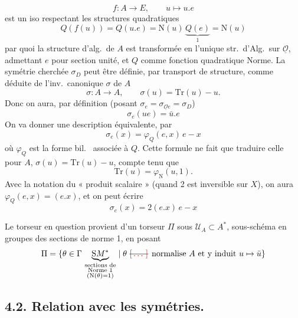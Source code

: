 \documentclass[11pt,a4paper]{article}
\begin{document}
\[
  f \colon A \to E, \qquad u \mapsto u.e
\]
est un iso respectant les structures quadratiques
\[
  Q(f(u)) = Q(u.e) = \mathrm{N}(u)\, \underbrace{Q(e)}_{1} = \mathrm{N}(u)
\]
par quoi la structure d'alg.\ de $A$ est transformée  en l'unique str.\ d'Alg.\ sur $\underline{\mathcal{O}}$, admettant $e$ pour section unité, et $Q$ comme fonction quadratique Norme. La symétrie cherchée $\sigma_D$ peut être définie, par transport de structure, comme déduite de l'inv.\ canonique $\sigma$ de $A$
\[
  \sigma \colon A \to A, \qquad \sigma(u) = \mathrm{Tr}(u) - u .
\]
Donc on aura, par définition (posant $\sigma_e = \sigma_{\underline{\mathcal{O}}e} = \sigma_D$)
\[
  \sigma_e(ue) = \bar{u}.e
\]
On va donner une description équivalente, par
\[
  \sigma_e(x) = \varphi_Q(e, x)\,e - x
\]
où $\varphi_Q$ est la forme bil.\  associée à $Q$. Cette formule ne fait que traduire celle pour $A$, $\sigma(u) = \mathrm{Tr}(u) - u$, compte tenu que
\[
  \mathrm{Tr}(u) = \varphi_{\mathrm{N}}(u, 1) .
\]
Avec la notation du « produit scalaire » (quand 2 est inversible sur $X$), on aura $\varphi_Q(e, x) = (e.x)$, et on peut écrire
\[
  \sigma_e(x) = 2(e.x)\,e - x
\]

 Le torseur en question provient d'un torseur $\Pi$ sous \struck{\ill{}} $\mathcal{U}_A \subset A^{*}$, sous-schéma en groupes des sections de norme 1, en posant
\[
  \Pi = \{\theta \in \Gamma\, \underbrace{\mathrm{S}M^{*}}_{\substack{\text{sections de}\\ \text{Norme } 1\\ (\mathrm{N}(\theta) = 1)}} \mid \theta \text{ \struck{\ill{}} normalise } A \text{ et y induit } u \mapsto \bar{u}\}
\]

\subsection*{4.2. Relation avec les symétries.}
\end{document}
